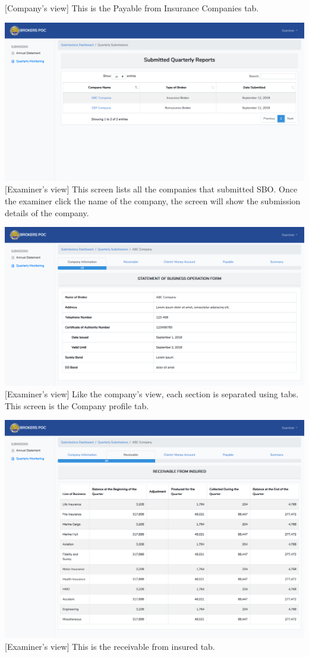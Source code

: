 \documentclass{article}
\begin{document}
[Company’s view] This is the Payable from Insurance
Companies tab.%

\includegraphics[keepaspectratio=true]{up-ic-screens/image74}{}[Examiner’s view] This screen lists all the companies that
submitted SBO. Once the examiner click the name of the company, the
screen will show the submission details of the company.%

\includegraphics[keepaspectratio=true]{up-ic-screens/image70}{}[Examiner’s view] Like the company’s view, each section is
separated using tabs. This screen is the Company profile tab.%

\includegraphics[keepaspectratio=true]{up-ic-screens/image189}{}[Examiner’s view] This is the receivable from insured
tab.%
\end{document}
